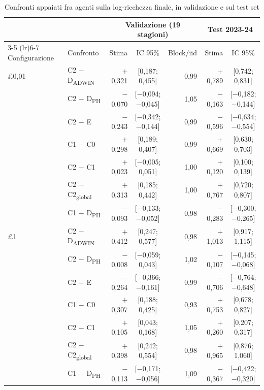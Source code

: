 \begin{table}[htbp]
\centering
\small
\setlength{\tabcolsep}{4pt}
\caption{Confronti appaiati fra agenti sulla log-ricchezza finale, in validazione e sul test set}
\label{tab:confronti}
\begin{tabular}{llrcrrc}
\toprule
 &  & \multicolumn{3}{c}{Validazione (19 stagioni)} & \multicolumn{2}{c}{Test 2023-24} \\
\cmidrule(lr){3-5} \cmidrule(lr){6-7}
Configurazione & Confronto & Stima & IC 95\% & Block/iid & Stima & IC 95\% \\
\midrule
\pounds{}0,01 & C2 $-$ D\textsubscript{ADWIN} & $+$0,321 & [0,187; 0,455] & 0,99 & $+$0,789 & [0,742; 0,831] \\
 & C2 $-$ D\textsubscript{PH} & $-$0,070 & [$-$0,094; $-$0,045] & 1,05 & $-$0,163 & [$-$0,182; $-$0,144] \\
 & C2 $-$ E & $-$0,243 & [$-$0,342; $-$0,144] & 0,99 & $-$0,596 & [$-$0,634; $-$0,554] \\
 & C1 $-$ C0 & $+$0,298 & [0,189; 0,407] & 0,99 & $+$0,669 & [0,630; 0,703] \\
 & C2 $-$ C1 & $+$0,023 & [$-$0,005; 0,051] & 1,00 & $+$0,120 & [0,100; 0,139] \\
 & C2 $-$ C2\textsubscript{global} & $+$0,313 & [0,185; 0,442] & 1,00 & $+$0,767 & [0,720; 0,807] \\
 & C1 $-$ D\textsubscript{PH} & $-$0,093 & [$-$0,133; $-$0,052] & 0,98 & $-$0,283 & [$-$0,300; $-$0,265] \\
\midrule
\pounds{}1 & C2 $-$ D\textsubscript{ADWIN} & $+$0,412 & [0,247; 0,577] & 0,98 & $+$1,013 & [0,917; 1,115] \\
 & C2 $-$ D\textsubscript{PH} & $-$0,008 & [$-$0,059; 0,043] & 1,02 & $-$0,107 & [$-$0,145; $-$0,068] \\
 & C2 $-$ E & $-$0,264 & [$-$0,366; $-$0,161] & 0,99 & $-$0,706 & [$-$0,764; $-$0,648] \\
 & C1 $-$ C0 & $+$0,307 & [0,188; 0,425] & 0,93 & $+$0,753 & [0,678; 0,827] \\
 & C2 $-$ C1 & $+$0,105 & [0,043; 0,168] & 1,05 & $+$0,260 & [0,207; 0,317] \\
 & C2 $-$ C2\textsubscript{global} & $+$0,398 & [0,242; 0,554] & 0,98 & $+$0,965 & [0,876; 1,060] \\
 & C1 $-$ D\textsubscript{PH} & $-$0,113 & [$-$0,171; $-$0,056] & 1,09 & $-$0,367 & [$-$0,422; $-$0,320] \\

\end{tabular}
\end{table}
